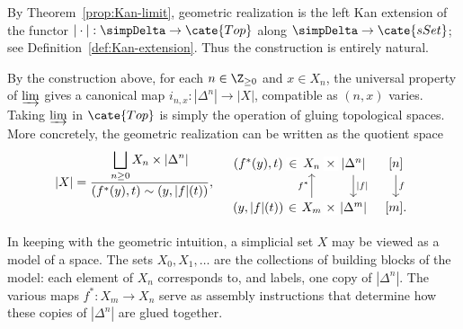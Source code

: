 \begin{remark}
	By Theorem~\ref{prop:Kan-limit}, geometric realization is the left Kan
	extension of the functor $|\cdot|:\simpDelta\to\cate{Top}$ along
	$\simpDelta\to\cate{sSet}$; see Definition~\ref{def:Kan-extension}.
	Thus the construction is entirely natural.
\end{remark}

By the construction above, for each $n\in\Z_{\geq0}$ and $x\in X_n$, the
universal property of $\varinjlim$ gives a canonical map
$i_{n,x}:|\Delta^n|\to|X|$, compatible as $(n,x)$ varies. Taking
$\varinjlim$ in $\cate{Top}$ is simply the operation of gluing topological
spaces. More concretely, the geometric realization can be written as the
quotient space
\begin{equation}\label{eqn:geom-realization-quotient}
	|X| = \dfrac{\displaystyle\bigsqcup_{n \geq 0} X_n \times |\Delta^n| }{(f^*(y), t) \sim (y, |f|(t)) }, \quad
	\begin{tikzcd}[column sep=tiny]
		(f^*(y), t) \arrow[phantom, r, "\in" description] & X_n \arrow[phantom, r, "\times" description] & {|\Delta^n|} \arrow[d, "{|f|}"] & {[n]} \arrow[d, "f"] \\
		(y, {|f|}(t)) \arrow[phantom, r, "\in" description] & X_m \arrow[phantom, r, "\times" description] \arrow[u, "{f^*}"] & {|\Delta^m|} & {[m]}.
	\end{tikzcd}
\end{equation}

In keeping with the geometric intuition, a simplicial set $X$ may be viewed
as a model of a space. The sets $X_0,X_1,\ldots$ are the collections of
building blocks of the model: each element of $X_n$ corresponds to, and
labels, one copy of $|\Delta^n|$. The various maps $f^*:X_m\to X_n$ serve as
assembly instructions that determine how these copies of $|\Delta^n|$ are
glued together.

